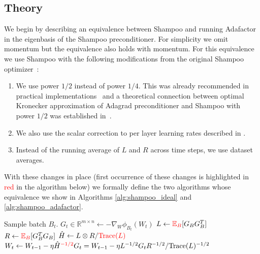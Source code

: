 \documentclass{article}
\newcommand{\E}{\mathbb{E}}
\newcommand{\red}[1]{\textcolor{red}{#1}}
\begin{document}
\subsection{Theory}

We begin by describing an equivalence between Shampoo and running Adafactor in the eigenbasis of the Shampoo preconditioner. For simplicity we omit momentum but the equivalence also holds with momentum. For this equivalence we  use Shampoo with the following modifications from the original Shampoo optimizer~\citep{shampoo}:
\begin{enumerate}
    \item We  use power $1/2$ instead of power $1/4$. This was already recommended in practical implementations~\citep{anil2020scalable,distributedshampoo} and a theoretical connection between optimal Kronecker approximation of Adagrad \citep{adagrad} preconditioner and Shampoo with power $1/2$ was established in~\cite{whyshampoo}. 
    \item  We also use the scalar correction to per layer learning rates described in \citet{yi21,whyshampoo}.
    \item Instead of the running average of $L$ and $R$ across time steps, we use dataset averages.
\end{enumerate}

With these changes in place (first occurrence of these changes is highlighted in \red{red} in the algorithm below) we formally define the two algorithms whose equivalence we  show in Algorithms \ref{alg:shampoo_ideal} and \ref{alg:shampoo_adafactor}.

\begin{algorithm}[H]

\begin{algorithmic}[1]
    \STATE Sample batch $B_t$.
    \STATE $G_{t} \in \mathbb{R}^{m \times n} \gets -\nabla_W \phi_{B_t}(W_t)$
    \STATE $L \gets \red{\E_{B}}[G_{B}G_{B}^T]$ 
    \STATE $R \gets \red{\E_{B}}[G_{B}^TG_{B}]$
    \STATE $\hat{H} \gets L \otimes R / \red{\text{Trace}(L)}$
    \STATE $W_t \gets W_{t-1} - \eta \hat{H}^{\red{-1/2}}G_{t} = W_{t-1} - \eta L^{-1/2}G_{t}R^{-1/2}/ \text{Trace}(L)^{-1/2}$
\end{algorithmic}
\caption{Single step of idealized Shampoo with power $1/2$.}
\label{alg:shampoo_ideal}
\end{algorithm}
\end{document}
